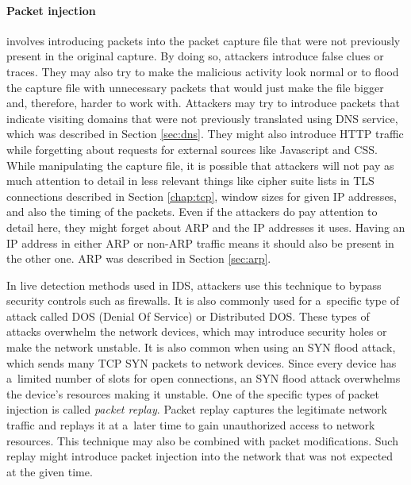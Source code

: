\documentclass[
  printed,     %
  color,       %
  oneside,     %
  nosansbold,  %
  nocolorbold, %
  nolof,         %
  nolot,         %
]{fithesis4}
\begin{document}
\paragraph{Packet injection} involves introducing packets into the packet capture file that were not previously present in the original capture. By doing so, attackers introduce false clues or traces. They may also try to make the malicious activity look normal or to flood the capture file with unnecessary packets that would just make the file bigger and, therefore, harder to work with. Attackers may try to introduce packets that indicate visiting domains that were not previously translated using DNS service, which was described in Section \ref{sec:dns}. They might also introduce HTTP traffic while forgetting about requests for external sources like Javascript and CSS. While manipulating the capture file, it is possible that attackers will not pay as much attention to detail in less relevant things like cipher suite lists in TLS connections described in Section \ref{chap:tcp}, window sizes for given IP addresses, and also the timing of the packets. Even if the attackers do pay attention to detail here, they might forget about ARP and the IP addresses it uses. Having an IP address in either ARP or non-ARP traffic means it should also be present in the other one. ARP was described in Section \ref{sec:arp}.

In live detection methods used in IDS, attackers use this technique to bypass security controls such as firewalls. It is also commonly used for a~specific type of attack called DOS (Denial Of Service) or Distributed DOS. These types of attacks overwhelm the network devices, which may introduce security holes or make the network unstable. It is also common when using an SYN flood attack, which sends many TCP SYN packets to network devices. Since every device has a~limited number of slots for open connections, an SYN flood attack overwhelms the device's resources making it unstable. One of the specific types of packet injection is called \textit{packet replay}. Packet replay captures the legitimate network traffic and replays it at a~later time to gain unauthorized access to network resources. This technique may also be combined with packet modifications. Such replay might introduce packet injection into the network that was not expected at the given time.
\end{document}
